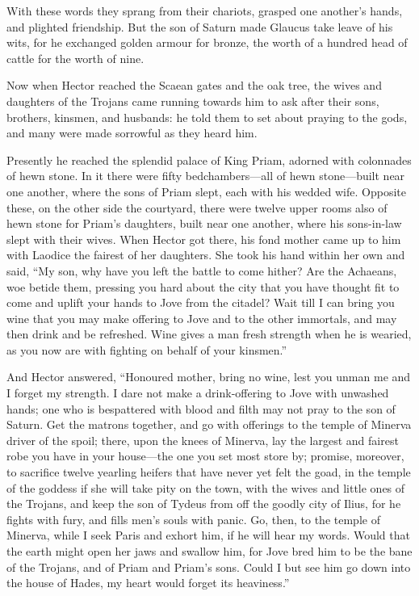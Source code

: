 With these words they sprang from their chariots, grasped one another’s
hands, and plighted friendship. But the son of Saturn made Glaucus take
leave of his wits, for he exchanged golden armour for bronze, the worth of
a hundred head of cattle for the worth of nine.

Now when Hector reached the Scaean gates and the oak tree, the wives and
daughters of the Trojans came running towards him to ask after their sons,
brothers, kinsmen, and husbands: he told them to set about praying to the
gods, and many were made sorrowful as they heard him.

Presently he reached the splendid palace of King Priam, adorned with
colonnades of hewn stone. In it there were fifty bedchambers—all of
hewn stone—built near one another, where the sons of Priam slept,
each with his wedded wife. Opposite these, on the other side the
courtyard, there were twelve upper rooms also of hewn stone for Priam’s
daughters, built near one another, where his sons-in-law slept with their
wives. When Hector got there, his fond mother came up to him with Laodice
the fairest of her daughters. She took his hand within her own and said,
“My son, why have you left the battle to come hither? Are the Achaeans,
woe betide them, pressing you hard about the city that you have thought
fit to come and uplift your hands to Jove from the citadel? Wait till I
can bring you wine that you may make offering to Jove and to the other
immortals, and may then drink and be refreshed. Wine gives a man fresh
strength when he is wearied, as you now are with fighting on behalf of
your kinsmen.”

And Hector answered, “Honoured mother, bring no wine, lest you unman me
and I forget my strength. I dare not make a drink-offering to Jove with
unwashed hands; one who is bespattered with blood and filth may not pray
to the son of Saturn. Get the matrons together, and go with offerings to
the temple of Minerva driver of the spoil; there, upon the knees of
Minerva, lay the largest and fairest robe you have in your house—the
one you set most store by; promise, moreover, to sacrifice twelve yearling
heifers that have never yet felt the goad, in the temple of the goddess if
she will take pity on the town, with the wives and little ones of the
Trojans, and keep the son of Tydeus from off the goodly city of Ilius, for
he fights with fury, and fills men’s souls with panic. Go, then, to the
temple of Minerva, while I seek Paris and exhort him, if he will hear my
words. Would that the earth might open her jaws and swallow him, for Jove
bred him to be the bane of the Trojans, and of Priam and Priam’s sons.
Could I but see him go down into the house of Hades, my heart would forget
its heaviness.”

